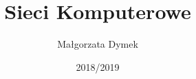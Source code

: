 \documentclass{unibooklet}
\title{%
\vskip 2cm
Sieci Komputerowe}
\author{Małgorzata Dymek}
\date{2018/2019}
\begin{document}
    \makeTitlePage
    \tableofcontents
    \pagebreak

\end{document}
